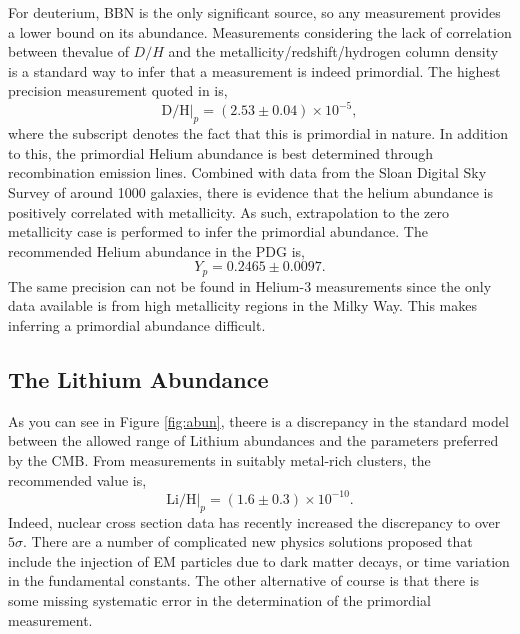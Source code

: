 \documentclass[11pt]{article}
\numberwithin{equation}{section}
\numberwithin{figure}{section}
\numberwithin{table}{section}
\begin{document}
For deuterium, BBN is the only significant source, so any measurement provides a lower bound on its abundance. Measurements considering the lack of correlation between thevalue of $D/H$ and the metallicity/redshift/hydrogen column density is a standard way to infer that a measurement is indeed primordial. The highest precision measurement quoted in \citet{Fields:2014uja} is,
\begin{equation}
\mathrm{D}/\mathrm{H}|_p = (2.53 \pm 0.04)\times 10^{-5},
\end{equation}
where the subscript denotes the fact that this is primordial in nature. In addition to this, the primordial Helium abundance is best determined through recombination emission lines. Combined with data from the Sloan Digital Sky Survey of around 1000 galaxies, there is evidence that the helium abundance is positively correlated with metallicity. As such, extrapolation to the zero metallicity case is performed to infer the primordial abundance. The recommended Helium abundance in the PDG \cite{Fields:2014uja} is,
\begin{equation}
Y_p = 0.2465 \pm 0.0097.
\end{equation}
The same precision can not be found in Helium-3 measurements since the only data available is from high metallicity regions in the Milky Way. This makes inferring a primordial abundance difficult.


\subsection{The Lithium Abundance}


As you can see in Figure \ref{fig:abun}, theere is a discrepancy in the standard model between the allowed range of Lithium abundances and the parameters preferred by the CMB. From measurements in suitably metal-rich clusters, the recommended value is,
\begin{equation}
\mathrm{Li}/\mathrm{H}|_p = (1.6 \pm 0.3) \times 10^{-10}.
\end{equation}
Indeed, nuclear cross section data has recently increased the discrepancy to over $5\sigma$. There are a number of complicated new physics solutions proposed that include the injection of EM particles due to dark matter decays, or time variation in the fundamental constants. The other alternative of course is that there is some missing systematic error in the determination of the primordial measurement.


\newpage

\end{document}
